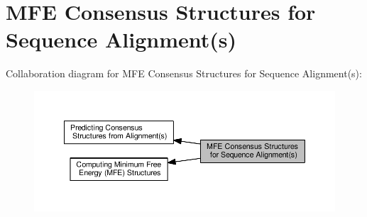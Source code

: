 \hypertarget{group__consensus__mfe__fold}{}\section{M\+F\+E Consensus Structures for Sequence Alignment(s)}
\label{group__consensus__mfe__fold}
Collaboration diagram for M\+F\+E Consensus Structures for Sequence Alignment(s)\+:
\nopagebreak
\begin{figure}[H]
\begin{center}
\leavevmode
\includegraphics[width=350pt]{group__consensus__mfe__fold}
\end{center}
\end{figure}
